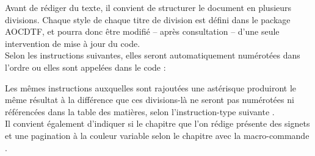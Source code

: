 \documentclass[a4paper, 11pt, twoside, fleqn]{memoir}
\begin{document}
	Avant de rédiger du texte, il convient de structurer le document en plusieurs divisions. Chaque style de chaque titre de division est défini dans le package AOCDTF, et pourra donc être modifié -- après consultation -- d'une seule intervention de mise à jour du code. \\ 
	Selon les instructions suivantes, elles seront automatiquement numérotées dans l'ordre ou elles sont appelées dans le code :

Les mêmes instructions auxquelles sont rajoutées une astérisque produiront le même résultat à la différence que ces divisions-là ne seront pas numérotées ni référencées dans la table des matières, selon l'instruction-type suivante \texttt{} .\\
Il convient également d'indiquer si le chapitre que l'on rédige présente des signets et une pagination à la couleur variable selon le chapitre avec la macro-commande \texttt{\ChapFrame} .
\end{document}
